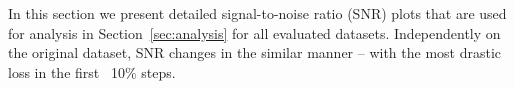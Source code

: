 In this section we present detailed signal-to-noise ratio (SNR) plots that are used for analysis in Section~\ref{sec:analysis} for all evaluated datasets. Independently on the original dataset, SNR changes in the similar manner -- with the most drastic loss in the first ~10\% steps.
\begin{figure}[ht]
	\centering
    \quad
    \quad
\end{figure}
